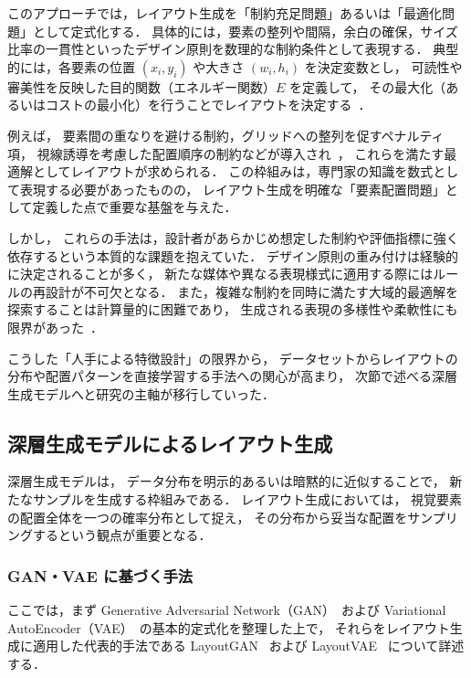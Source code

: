 \documentclass[a4j,12pt,dvipdfmx]{jsreport}
\begin{document}
このアプローチでは，レイアウト生成を「制約充足問題」あるいは「最適化問題」として定式化する．
具体的には，要素の整列や間隔，余白の確保，サイズ比率の一貫性といったデザイン原則を数理的な制約条件として表現する．
典型的には，各要素の位置 $(x_i, y_i)$ や大きさ $(w_i, h_i)$ を決定変数とし，
可読性や審美性を反映した目的関数（エネルギー関数）$E$ を定義して，
その最大化（あるいはコストの最小化）を行うことでレイアウトを決定する~\cite{roth1994data}．%

例えば，
要素間の重なりを避ける制約，グリッドへの整列を促すペナルティ項，
視線誘導を考慮した配置順序の制約などが導入され~\cite{feiner1988constraint,kamps1999constraints}，%
これらを満たす最適解としてレイアウトが求められる．
この枠組みは，専門家の知識を数式として表現する必要があったものの，
レイアウト生成を明確な「要素配置問題」として定義した点で重要な基盤を与えた．

しかし，
これらの手法は，設計者があらかじめ想定した制約や評価指標に強く依存するという本質的な課題を抱えていた．
デザイン原則の重み付けは経験的に決定されることが多く，
新たな媒体や異なる表現様式に適用する際にはルールの再設計が不可欠となる．
また，複雑な制約を同時に満たす大域的最適解を探索することは計算量的に困難であり，
生成される表現の多様性や柔軟性にも限界があった~\cite{shi_intelligent_2023}．%

こうした「人手による特徴設計」の限界から，
データセットからレイアウトの分布や配置パターンを直接学習する手法への関心が高まり，
次節で述べる深層生成モデルへと研究の主軸が移行していった．

\subsection{深層生成モデルによるレイアウト生成}
深層生成モデルは，
データ分布を明示的あるいは暗黙的に近似することで，
新たなサンプルを生成する枠組みである．
レイアウト生成においては，
視覚要素の配置全体を一つの確率分布として捉え，
その分布から妥当な配置をサンプリングするという観点が重要となる．
\subsubsection{GAN・VAE に基づく手法}
ここでは，まず
Generative Adversarial Network（GAN）~\cite{goodfellow2014generative}および
Variational AutoEncoder（VAE）~\cite{kingma2013autoencoding}の基本的定式化を整理した上で，
それらをレイアウト生成に適用した代表的手法である
LayoutGAN~\cite{li_layoutgan_2019} および LayoutVAE~\cite{jyothi_layoutvae_2021} について詳述する．
\end{document}
